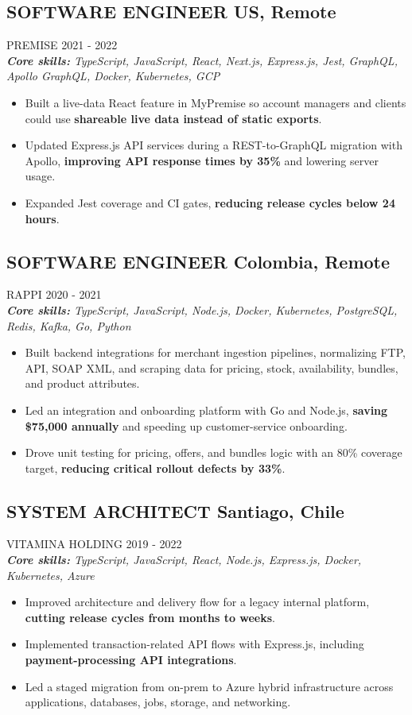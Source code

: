 \documentclass{article}
\newcommand{\WorkExperience}[2]{
   \subsection*{#1}
   \vspace{-1em}
   \uppercase{#2}
}
\newcommand{\Skills}[1]{
   \textit{\textbf{Core skills:} #1}
}
\begin{document}
\WorkExperience{SOFTWARE ENGINEER \hfill US, Remote}{Premise \hfill 2021 {-} 2022} \\
\Skills{TypeScript, JavaScript, React, Next.js, Express.js, Jest, GraphQL, Apollo GraphQL, Docker, Kubernetes, GCP}
\begin{itemize}
	\item Built a live-data React feature in MyPremise so account managers and clients could use \textbf{shareable live data instead of static exports}.
	\item Updated Express.js API services during a REST-to-GraphQL migration with Apollo, \textbf{improving API response times by 35\%} and lowering server usage.
	\item Expanded Jest coverage and CI gates, \textbf{reducing release cycles below 24 hours}.
\end{itemize}

\WorkExperience{SOFTWARE ENGINEER \hfill Colombia, Remote}{Rappi \hfill 2020 {-} 2021} \\
\Skills{TypeScript, JavaScript, Node.js, Docker, Kubernetes, PostgreSQL, Redis, Kafka, Go, Python}
\begin{itemize}
	\item Built backend integrations for merchant ingestion pipelines, normalizing FTP, API, SOAP XML, and scraping data for pricing, stock, availability, bundles, and product attributes.
	\item Led an integration and onboarding platform with Go and Node.js, \textbf{saving \$75,000 annually} and speeding up customer-service onboarding.
	\item Drove unit testing for pricing, offers, and bundles logic with an 80\% coverage target, \textbf{reducing critical rollout defects by 33\%}.
\end{itemize}

\WorkExperience{SYSTEM ARCHITECT \hfill Santiago, Chile}{Vitamina Holding \hfill 2019 {-} 2022} \\
\Skills{TypeScript, JavaScript, React, Node.js, Express.js, Docker, Kubernetes, Azure}
\begin{itemize}
	\item Improved architecture and delivery flow for a legacy internal platform, \textbf{cutting release cycles from months to weeks}.
	\item Implemented transaction-related API flows with Express.js, including \textbf{payment-processing API integrations}.
	\item Led a staged migration from on-prem to Azure hybrid infrastructure across applications, databases, jobs, storage, and networking.
\end{itemize}
\end{document}
